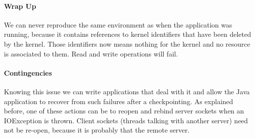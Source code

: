 \paragraph{Wrap Up}
We can never reproduce the same environment as when the application was running, because it contains references to kernel identifiers that
have been deleted by the kernel. Those identifiers now means nothing for the kernel and no resource is associated to them. Read and write
operations will fail.

\paragraph{Contingencies}
Knowing this issue we can write applications that deal with it and allow the Java application to recover from such failures after a
checkpointing. As explained before, one of these actions can be to re\-open and re\-bind server sockets when an IOException is thrown.
Client sockets (threads talking with another server) need not be re-open, because it is probably that the remote server.
